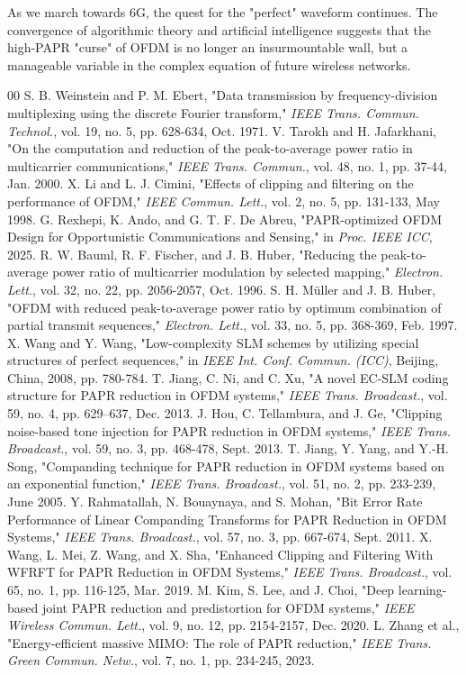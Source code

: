 \documentclass[journal]{IEEEtran}
\begin{document}
As we march towards 6G, the quest for the "perfect" waveform continues. The convergence of algorithmic theory and artificial intelligence suggests that the high-PAPR "curse" of OFDM is no longer an insurmountable wall, but a manageable variable in the complex equation of future wireless networks.


\begin{thebibliography}{00}
     S. B. Weinstein and P. M. Ebert, "Data transmission by frequency-division multiplexing using the discrete Fourier transform," \textit{IEEE Trans. Commun. Technol.}, vol. 19, no. 5, pp. 628-634, Oct. 1971.
     V. Tarokh and H. Jafarkhani, "On the computation and reduction of the peak-to-average power ratio in multicarrier communications," \textit{IEEE Trans. Commun.}, vol. 48, no. 1, pp. 37-44, Jan. 2000.
     X. Li and L. J. Cimini, "Effects of clipping and filtering on the performance of OFDM," \textit{IEEE Commun. Lett.}, vol. 2, no. 5, pp. 131-133, May 1998.
     G. Rexhepi, K. Ando, and G. T. F. De Abreu, "PAPR-optimized OFDM Design for Opportunistic Communications and Sensing," in \textit{Proc. IEEE ICC}, 2025.
     R. W. Bauml, R. F. Fischer, and J. B. Huber, "Reducing the peak-to-average power ratio of multicarrier modulation by selected mapping," \textit{Electron. Lett.}, vol. 32, no. 22, pp. 2056-2057, Oct. 1996.
     S. H. Müller and J. B. Huber, "OFDM with reduced peak-to-average power ratio by optimum combination of partial transmit sequences," \textit{Electron. Lett.}, vol. 33, no. 5, pp. 368-369, Feb. 1997.
     X. Wang and Y. Wang, "Low-complexity SLM schemes by utilizing special structures of perfect sequences," in \textit{IEEE Int. Conf. Commun. (ICC)}, Beijing, China, 2008, pp. 780-784.
     T. Jiang, C. Ni, and C. Xu, "A novel EC-SLM coding structure for PAPR reduction in OFDM systems," \textit{IEEE Trans. Broadcast.}, vol. 59, no. 4, pp. 629–637, Dec. 2013.
     J. Hou, C. Tellambura, and J. Ge, "Clipping noise-based tone injection for PAPR reduction in OFDM systems," \textit{IEEE Trans. Broadcast.}, vol. 59, no. 3, pp. 468-478, Sept. 2013.
     T. Jiang, Y. Yang, and Y.-H. Song, "Companding technique for PAPR reduction in OFDM systems based on an exponential function," \textit{IEEE Trans. Broadcast.}, vol. 51, no. 2, pp. 233-239, June 2005.
     Y. Rahmatallah, N. Bouaynaya, and S. Mohan, "Bit Error Rate Performance of Linear Companding Transforms for PAPR Reduction in OFDM Systems," \textit{IEEE Trans. Broadcast.}, vol. 57, no. 3, pp. 667-674, Sept. 2011.
     X. Wang, L. Mei, Z. Wang, and X. Sha, "Enhanced Clipping and Filtering With WFRFT for PAPR Reduction in OFDM Systems," \textit{IEEE Trans. Broadcast.}, vol. 65, no. 1, pp. 116-125, Mar. 2019.
     M. Kim, S. Lee, and J. Choi, "Deep learning-based joint PAPR reduction and predistortion for OFDM systems," \textit{IEEE Wireless Commun. Lett.}, vol. 9, no. 12, pp. 2154-2157, Dec. 2020.
     L. Zhang et al., "Energy-efficient massive MIMO: The role of PAPR reduction," \textit{IEEE Trans. Green Commun. Netw.}, vol. 7, no. 1, pp. 234-245, 2023.
\end{thebibliography}
\end{document}
